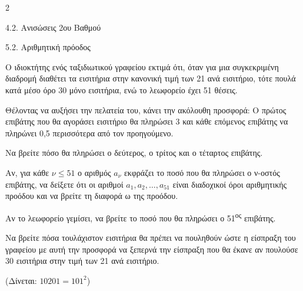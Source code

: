 \begin{ylh}{2}
    \item 4.2. Ανισώσεις 2ου Βαθμού
    \item 5.2. Αριθμητική πρόοδος
\end{ylh}
Ο ιδιοκτήτης ενός ταξιδιωτικού γραφείου εκτιμά ότι, όταν για μια συγκεκριμένη διαδρομή διαθέτει τα εισιτήρια στην κανονική τιμή των 21\text{\euro} ανά εισιτήριο, τότε πουλά κατά μέσο όρο 30 μόνο εισιτήρια, ενώ το λεωφορείο έχει 51 θέσεις.

Θέλοντας να αυξήσει την πελατεία του, κάνει την ακόλουθη προσφορά: Ο πρώτος επιβάτης που θα αγοράσει εισιτήριο θα πληρώσει 3\text{\euro} και κάθε επόμενος επιβάτης να πληρώνει 0,5\text{\euro} περισσότερα από τον προηγούμενο.

\begin{alist}
\item Να βρείτε πόσο θα πληρώσει ο δεύτερος, ο τρίτος και ο τέταρτος επιβάτης.

\item Αν, για κάθε $\nu \le 51$ ο αριθμός $a_\nu$ εκφράζει το ποσό που θα πληρώσει ο ν-οστός επιβάτης, να δείξετε ότι οι αριθμοί $a_1, a_2, \dots, a_{51}$ είναι διαδοχικοί όροι αριθμητικής προόδου και να βρείτε τη διαφορά ω της προόδου.
\item Αν το λεωφορείο γεμίσει, να βρείτε το ποσό που θα πληρώσει ο 51\textsuperscript{ος} επιβάτης.

\item Να βρείτε πόσα τουλάχιστον εισιτήρια θα πρέπει να πουληθούν ώστε η είσπραξη του γραφείου με αυτή την προσφορά να ξεπερνά την είσπραξη που θα έκανε αν πουλούσε 30 εισιτήρια στην τιμή των 21\text{\euro} ανά εισιτήριο.

(Δίνεται: $10201 = 101^2$) 
\end{alist}

